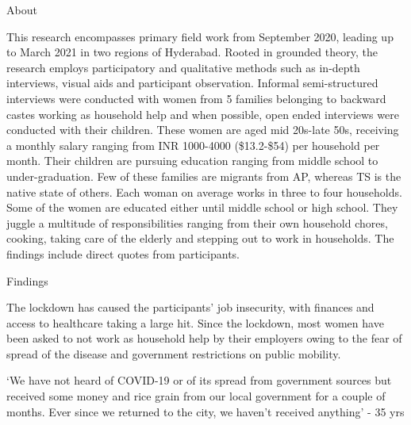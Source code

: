 \documentclass[final]{beamer}
\newlength{\colwidth}
\begin{document}
\begin{frame}[t]
\begin{columns}[t]
\begin{column}{\colwidth}
\vspace{-0.5cm}
  \begin{block}{About}

This research encompasses primary field work from September 2020,
leading up to March 2021 in two regions of Hyderabad. Rooted in
grounded theory, the research employs participatory and qualitative
methods such as in-depth interviews, visual aids and participant
observation. Informal semi-structured interviews were conducted with
women from 5 families belonging to backward castes working as
household help and when possible, open ended interviews were
conducted with their children. These women are aged mid 20s-late 50s,
receiving a monthly salary ranging from INR 1000-4000 (\$13.2-\$54) per
household per month. Their children are pursuing education ranging
from middle school to under-graduation. Few of these families are
migrants from AP, whereas TS is the native state of others. Each woman
on average works in three to four households. Some of the women are
educated either until middle school or high school. They juggle a
multitude of responsibilities ranging from their own household chores,
cooking, taking care of the elderly and stepping out to work in
households. The findings include direct quotes from participants.

  \end{block}

\vspace{-0.5cm}
  \begin{block}{Findings}

  The lockdown has caused the participants’ job insecurity, with finances
and access to healthcare taking a large hit. Since the lockdown, most
women have been asked to not work as household help by their
employers owing to the fear of spread of the disease and government
restrictions on public mobility.

\end{block}

 \begin{alertblock}{}

`We have not heard of COVID-19 or
of its spread from government
sources but received some money
and rice grain from our local
government for a couple of
months. Ever since we returned to
the city, we haven’t received
anything' - 35 yrs

  \end{alertblock}




\end{column}
\end{columns}
\end{frame}
\end{document}
